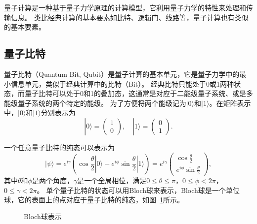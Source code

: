 量子计算是一种基于量子力学原理的计算模型，它利用量子力学的特性来处理和传输信息。
类比经典计算的基本要素如比特、逻辑门、线路等，量子计算也有类似的基本要素。

\subsection{量子比特}
量子比特（Quantum Bit, Qubit）是量子计算的基本单元，它是量子力学中的最小信息单元，类似于经典计算中的比特（Bit）。
经典比特只能处于0或1两种状态，而量子比特可以处于0和1的叠加态，这通常是对应于二能级量子系统、或是多能级量子系统的两个特定的能级。
为了方便将两个能级记为$|0\rangle$和$|1\rangle$。在矩阵表示中，$|0\rangle$和$|1\rangle$分别表示为
\begin{equation}
    |0\rangle = \begin{pmatrix} 1 \\ 0 \end{pmatrix}, \quad |1\rangle = \begin{pmatrix} 0 \\ 1 \end{pmatrix}.
\end{equation}

一个任意量子比特的纯态可以表示为
\begin{equation}
    |\psi\rangle = e^{i\gamma}(\cos\frac{\theta}{2}|0\rangle + e^{i\phi}\sin\frac{\theta}{2}|1\rangle)=e^{i\gamma}\begin{pmatrix}
        \cos\frac{\theta}{2} \\ e^{i\phi}\sin\frac{\theta}{2}
    \end{pmatrix},
\end{equation}
其中$\theta$和$\phi$是两个角度，$\gamma$是一个全局相位，满足$0 \leq \theta \leq \pi$，$0 \leq \phi < 2\pi$，$0 \leq \gamma < 2\pi$。 单个量子比特的状态可以用Bloch球来表示，Bloch球是一个单位球，它的表面上的点对应于量子比特的纯态，如图~\ref{fig:bloch_sphere}所示。



\begin{figure}[H]
  \centering
  \caption{Bloch球表示}
  \label{fig:bloch_sphere}
\end{figure}

